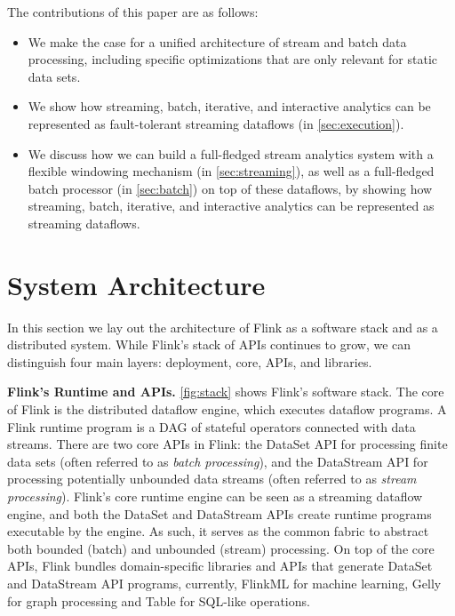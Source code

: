 \documentclass[11pt]{article}
\newcommand{\para}[1]{\vspace{2mm}\noindent\textbf{#1}}
\begin{document}
\vspace{2mm}
\noindent The contributions of this paper are as follows:\vspace{-2mm}
\begin{itemize}
	\item We make the case for a unified architecture of stream and batch data processing, including specific optimizations that are only relevant for static data sets.
	\vspace{-3mm}
	\item We show how streaming, batch, iterative, and interactive analytics can be represented as fault-tolerant streaming dataflows (in \autoref{sec:execution}).
	\vspace{-3mm}
	\item We discuss how we can build a full-fledged stream analytics system with a flexible windowing mechanism (in \autoref{sec:streaming}), as well as a full-fledged batch processor (in \autoref{sec:batch}) on top of these dataflows, by showing how streaming, batch, iterative, and interactive analytics can be represented as streaming dataflows.
\end{itemize}





\section{System Architecture}
\label{sec:architecture}
\vspace{-2mm}
In this section we lay out the architecture of Flink as a software stack and as a distributed system. While Flink's stack of APIs continues to grow, we can distinguish four main layers: deployment, core, APIs, and libraries.

\para{Flink's Runtime and APIs.}  \autoref{fig:stack} shows Flink's software stack. The core of Flink is the distributed dataflow engine, which executes dataflow programs. A Flink runtime program is a DAG of stateful operators connected with data streams. There are two core APIs in Flink: the DataSet API for processing finite data sets (often referred to as \emph{batch processing}), and the DataStream API for processing potentially unbounded data streams (often referred to as \emph{stream processing}). Flink's core runtime engine can be seen as a streaming dataflow engine, and both the DataSet and DataStream APIs create runtime programs executable by the engine. As such, it serves as the common fabric to abstract both bounded (batch) and unbounded (stream) processing. On top of the core APIs, Flink bundles domain-specific libraries and APIs that generate DataSet and DataStream API programs, currently, FlinkML for machine learning, Gelly  for graph processing and Table for SQL-like operations. 
\end{document}
